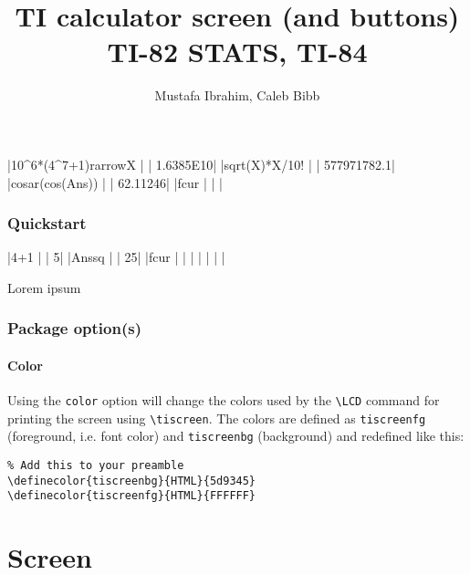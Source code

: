 \documentclass[a4paper,12pt]{article}
\title{TI calculator screen (and buttons)\\{\small TI-82 STATS, TI-84}}
\author{Mustafa Ibrahim, Caleb Bibb}
\newcommand{\printcmd}[1]{\texttt{\textbackslash #1}}
\begin{document}
\maketitle

\begin{center}
\tiscreen
|10^6*(4^7+1){rarrow}X  |
|       1.6385E10|
|{sqrt}(X)*X/10!      |
|     577971782.1|
|cos{ar}(cos(Ans))  |
|        62.11246|
|{fcur}               |
|                |

\tibtnmatrixextra
\end{center}

\tableofcontents\newpage

\section{Quickstart}

\begin{SideBySideExample}[xrightmargin=5.5cm]

\tiscreen
|4+1             |
|               5|
|Ans{sq}         |
|              25|
|{fcur}          |
|                |
|                |
|                |

\tibtnmatrixextra

Lorem
ipsum

\end{SideBySideExample}

\section{Package option(s)}
\subsection{Color}

Using the \texttt{color} option will change the colors used by the
\printcmd{LCD} command for printing the screen using \printcmd{tiscreen}. The
colors are defined as \texttt{tiscreenfg} (foreground, i.e. font color) and
\texttt{tiscreenbg} (background) and redefined like this:

\begin{Verbatim}
% Add this to your preamble
\definecolor{tiscreenbg}{HTML}{5d9345}
\definecolor{tiscreenfg}{HTML}{FFFFFF}
\end{Verbatim}

\newpage

\part{Screen}
\end{document}
